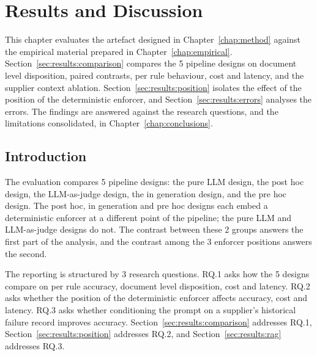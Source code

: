
\chapter{Results and Discussion} \label{chap:results}

This chapter evaluates the artefact designed in Chapter~\ref{chap:method} against the empirical material prepared in Chapter~\ref{chap:empirical}. Section~\ref{sec:results:comparison} compares the 5 pipeline designs on document level disposition, paired contrasts, per rule behaviour, cost and latency, and the supplier context ablation. Section~\ref{sec:results:position} isolates the effect of the position of the deterministic enforcer, and Section~\ref{sec:results:errors} analyses the errors. The findings are answered against the research questions, and the limitations consolidated, in Chapter~\ref{chap:conclusions}.


\section{Introduction}
\label{sec:results:intro}

The evaluation compares 5 pipeline designs: the pure LLM design, the post hoc design, the LLM-as-judge design, the in generation design, and the pre hoc design. The post hoc, in generation and pre hoc designs each embed a deterministic enforcer at a different point of the pipeline; the pure LLM and LLM-as-judge designs do not. The contrast between these 2 groups answers the first part of the analysis, and the contrast among the 3 enforcer positions answers the second.

The reporting is structured by 3 research questions. RQ.1 asks how the 5 designs compare on per rule accuracy, document level disposition, cost and latency. RQ.2 asks whether the position of the deterministic enforcer affects accuracy, cost and latency. RQ.3 asks whether conditioning the prompt on a supplier's historical failure record improves accuracy. Section~\ref{sec:results:comparison} addresses RQ.1, Section~\ref{sec:results:position} addresses RQ.2, and Section~\ref{sec:results:rag} addresses RQ.3.

